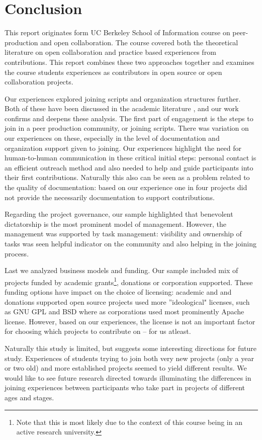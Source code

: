 \section{Conclusion}

This report originates form UC Berkeley School of Information course on peer-production and open collaboration. The course covered both the theoretical literature on open collaboration and practice based experiences from contributions. This report combines these two approaches together and examines the course students experiences as contributors in open source or open collaboration projects.

Our experiences explored joining scripts and organization structures further. Both of these have been discussed in the academic literature \cite{x,y,z}, and our work confirms and deepens these analysis. The first part of engagement is the steps to join in a peer production community, or joining scripts. There was variation on our experiences on these, especially in the level of documentation and organization support given to joining. Our experiences highlight the need for human-to-human communication in these critical initial steps: personal contact is an efficient outreach method and also needed to help and guide participants into their first contributions. Naturally this also can be seen as a problem related to the quality of documentation: based on our experience one in four projects did not provide the necessarily documentation to support contributions.

Regarding the project governance, our sample highlighted that benevolent dictatorship is the most prominent model of management. However, the management was supported by task management: visibility and ownership of tasks was seen helpful indicator on the community and also helping in the joining process.

Last we analyzed business models and funding. Our sample included mix of projects funded by academic grants\footnote{Note that this is most likely due to the context of this course being in an active research university.}, donations or corporation supported. These funding options have impact on the choice of licensing: academic and and donations supported open source projects used more ''ideological" licenses, such as GNU GPL and BSD where as corporations used most prominently Apache license. However, based on our experiences, the license is not an important factor for choosing which projects to contribute on -- for us atleast.

Naturally this study is limited, but suggests some interesting directions for future study. Experiences of students trying to join both very new projects (only a year or two old) and more established projects seemed to yield different results.  We would like to see future research directed towards illuminating the differences in joining experiences between participants who take part in projects of different ages and stages. 

